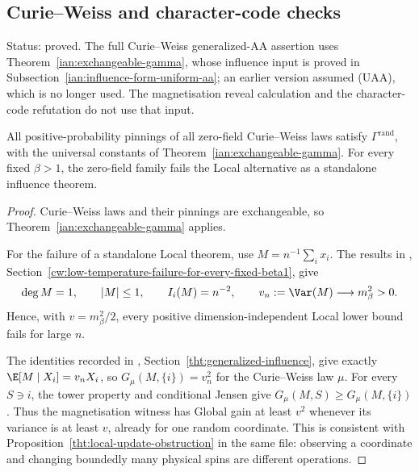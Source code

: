\subsection{Curie--Weiss and character-code checks}
\label{ian:generalized-influence-checks}

Status: proved. The full Curie--Weiss generalized-AA assertion uses
Theorem~\ref{ian:exchangeable-gamma}, whose influence input is proved
in Subsection~\ref{ian:influence-form-uniform-aa}; an earlier version
assumed (UAA), which is no longer used. The magnetisation reveal
calculation and the character-code refutation do not use that input.

\begin{proposition}
\label{ian:cw-generalized-check}
All positive-probability pinnings of all zero-field
Curie--Weiss laws satisfy \(\Gamma^{\mathrm{rand}}\), with the universal
constants of Theorem~\ref{ian:exchangeable-gamma}. For every fixed
\(\beta>1\), the zero-field family fails the Local alternative as a
standalone influence theorem.
\end{proposition}

\begin{proof}
Curie--Weiss laws and their pinnings are exchangeable, so
Theorem~\ref{ian:exchangeable-gamma} applies.

For the failure of a standalone Local theorem, use
\(M=n^{-1}\sum_i x_i\). The results in
,
Section~\ref{cw:low-temperature-failure-for-every-fixed-beta1}, give
\[
 \deg M=1,\qquad |M|\le1,\qquad
 I_i(M)=n^{-2},\qquad
 v_n:=\Var(M)\longrightarrow m_\beta^2>0.
\]
Hence, with \(v=m_\beta^2/2\), every positive dimension-independent
Local lower bound fails for large \(n\).

The identities recorded in
,
Section~\ref{tht:generalized-influence}, give exactly
\(\E[M\mid X_i]=v_nX_i\), so \(G_\mu(M,\{i\})=v_n^2\) for the
Curie--Weiss law \(\mu\). For every \(S\ni i\), the tower property and
conditional Jensen give \(G_\mu(M,S)\ge G_\mu(M,\{i\})\). Thus the magnetisation witness has
Global gain at least \(v^2\) whenever its variance is at least \(v\),
already for one random coordinate. This is consistent with
Proposition~\ref{tht:local-update-obstruction} in the same file:
observing a coordinate and changing boundedly many physical spins are
different operations.
\end{proof}

